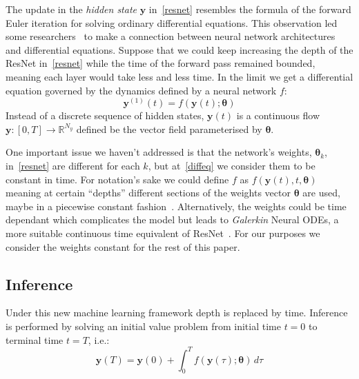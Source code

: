 \documentclass[11pt]{report}
\begin{document}
    The update in the \textit{hidden state} $\pmb{y}$ in~\eqref{resnet} resembles the formula of the forward Euler iteration for solving ordinary differential equations.
    This observation led some researchers~\cite{lu2018beyond,weinan2018mean,ruthotto2020deep} to make a connection between neural network architectures and differential equations.
    Suppose that we could keep increasing the depth of the ResNet in~\eqref{resnet} while the time of the forward pass remained bounded, meaning each layer would take less and less time.
    In the limit we get a differential equation governed by the dynamics defined by a neural network $f$:
    \begin{equation}
        \pmb{y}^{(1)}(t) = f(\pmb{y}(t); \pmb{\theta}) \label{diffeq}
    \end{equation}
    Instead of a discrete sequence of hidden states, $\pmb{y}(t)$ is a continuous flow $\pmb{y} : [0,T] \to \mathbb{R}^{N_y}$ defined be the vector field parameterised by $\pmb{\theta}$.

    One important issue we haven't addressed is that the network's weights, $\pmb\theta_k$, in~\eqref{resnet} are
    different for each $k$, but at~\eqref{diffeq} we consider them to be constant in time.
    For notation’s sake we could define $f$ as $f(\pmb{y}(t), t, \pmb{\theta})$ meaning at certain ``depths'' different sections of the weights vector $\pmb{\theta}$ are used, maybe in a piecewise constant fashion~\cite{kidger2022neural}.
    Alternatively, the weights could be time dependant which complicates the model but leads to \textit{Galerkin} Neural ODEs, a more suitable continuous time equivalent of ResNet~\cite{massaroli2020dissecting}.
    For our purposes we consider the weights constant for the rest of this paper.

    \subsection{Inference}
    Under this new machine learning framework depth is replaced by time.
    Inference is performed by solving an initial value problem from initial time $t=0$ to terminal time $t=T$, i.e.:
    \begin{equation}
        \pmb{y}(T) = \pmb{y}(0) + \int_{0}^{T} f(\pmb{y}(\tau); \pmb{\theta}) \, d\tau \label{ivp}
    \end{equation}
\end{document}
